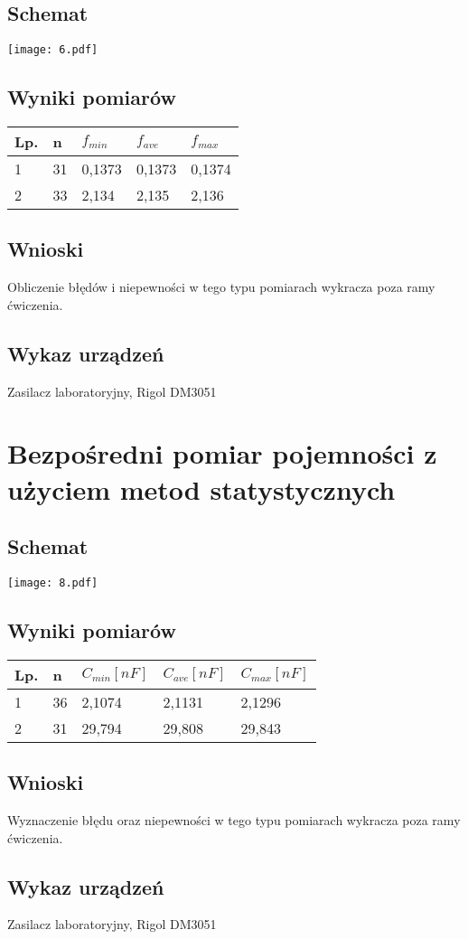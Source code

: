 \documentclass[11pt]{article}
\begin{document}
\subsection{Schemat}
\begin{center}
\texttt{[image: 6.pdf]}
\end{center}
\subsection{Wyniki pomiarów}
\begin{center}
\begin{tabular}{|l|l|l|l|l|}
\hline
	Lp. & n & $f_{min}$ & $f_{ave}$ & $f_{max}$ \\
\hline
	1 & 31 & 0,1373 & 0,1373 & 0,1374\\
\hline
	2 & 33 & 2,134 & 2,135 & 2,136\\
\hline
\end{tabular}
\end{center}
\subsection{Wnioski}
Obliczenie błędów i niepewności w tego typu pomiarach wykracza poza ramy ćwiczenia.
\subsection{Wykaz urządzeń}
Zasilacz laboratoryjny, Rigol DM3051

\newpage
\section{Bezpośredni pomiar pojemności z użyciem metod statystycznych}
\subsection{Schemat}
\begin{center}
\texttt{[image: 8.pdf]}
\end{center}
\subsection{Wyniki pomiarów}
\begin{center}
\begin{tabular}{|l|l|l|l|l|}
\hline
	Lp. & n & $C_{min}[nF]$ & $C_{ave}[nF]$ & $C_{max}[nF]$\\
\hline
	1 & 36 & 2,1074 & 2,1131 & 2,1296\\
\hline
	2 & 31 & 29,794 & 29,808 & 29,843\\
\hline
\end{tabular}
\end{center}
\subsection{Wnioski}
Wyznaczenie błędu oraz niepewności w tego typu pomiarach wykracza poza ramy ćwiczenia.
\subsection{Wykaz urządzeń}
Zasilacz laboratoryjny, Rigol DM3051
\end{document}
